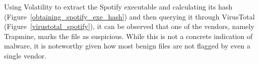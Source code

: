 \begin{myenum}
    \item Using Volatility to extract the Spotify executable and calculating its hash (Figure~\ref{obtaining_spotify_exe_hash}) and then querying it through VirusTotal (Figure~\ref{virustotal_spotify}), it can be observed that one of the vendors, namely Trapmine, marks the file as suspicious. While this is not a concrete indication of malware, it is noteworthy given how most benign files are not flagged by even a single vendor.
\end{myenum}

